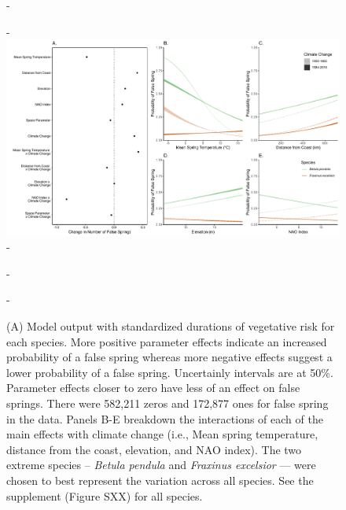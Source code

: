 \documentclass{article}\usepackage[]{graphicx}\usepackage[]{color}
\begin{document}
  
{\begin{figure} [H]
  -\begin{center}
  -\includegraphics[width=16cm]{..//figures/MainModel_wAPCplots.pdf}
  -\caption{(A) Model output with standardized durations of vegetative risk for each species. More positive parameter effects indicate an increased probability of a false spring whereas more negative effects suggest a lower probability of a false spring. Uncertainly intervals are at 50\%. Parameter effects closer to zero have less of an effect on false springs. There were 582,211 zeros and 172,877 ones for false spring in the data. Panels B-E breakdown the interactions of each of the main effects with climate change (i.e., Mean spring temperature, distance from the coast, elevation, and NAO index). The two extreme species -- \textit{Betula pendula} and \textit{Fraxinus excelsior} --- were chosen to best represent the variation across all species. See the supplement (Figure SXX) for all species.
  }\label{fig:maineffects}
  -\end{center}
  -\end{figure}}


  
\end{document}
